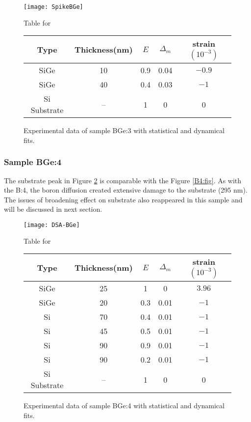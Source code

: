 \begin{figure}[ht]%
\caption{Experimental data of sample BGe:3 with statistical and dynamical fits.}
\label{BGe3:fig}
\begin{minipage}{\linewidth}
\texttt{[image: SpikeBGe]}
\end{minipage}
\begin{minipage}{\linewidth}
\centering
\vspace{10pt}
Table for \\
\begin{tabular}[htbp]{@{}c|cccc@{}}
    \hline
  Type & Thickness(nm) & $E$ & $\Delta_m$ & strain $(10^{-3})$ \\
    \hline
  SiGe & 10 & 0.9 & 0.04 & $-0.9$  \\
  SiGe & 40 & 0.4 & 0.03 & $-1 $  \\
  Si Substrate & -- & 1 & 0 & 0
  \end{tabular}
\end{minipage}
\end{figure}

\subsubsection{Sample BGe:4}

The substrate peak in Figure \ref{BGe4:fig} is comparable with the Figure \ref{B4:fig}.  As with the B:4, the boron diffusion created extensive damage to the substrate (295 nm).  The issues of broadening effect on substrate also reappeared in this sample and will be discussed in next section.

\begin{figure}[ht]%
\caption{Experimental data of sample BGe:4 with statistical and dynamical fits.}
\label{BGe4:fig}
\begin{minipage}{\linewidth}
\texttt{[image: DSA-BGe]}
\end{minipage}
\begin{minipage}{\linewidth}
\centering
\vspace{10pt}
Table for \\
\begin{tabular}[htbp]{@{}c|cccc@{}}
    \hline
  Type & Thickness(nm) & $E$ & $\Delta_m$ & strain $(10^{-3})$ \\
    \hline
  SiGe 	& 25 & 1   & 0    & $3.96 $  \\
  SiGe 	& 20 & 0.3 & 0.01 & $-1 	$  \\
  Si   	& 70 & 0.4 & 0.01 & $-1		$ \\
  Si 		& 45 & 0.5 & 0.01 & $-1		$\\
  Si 		& 90 & 0.9 & 0.01 & $-1		$\\
  Si 		& 90 & 0.2 & 0.01 & $-1		$\\
  Si Substrate & -- & 1 & 0 & 0
  \end{tabular}
\end{minipage}
\end{figure}

